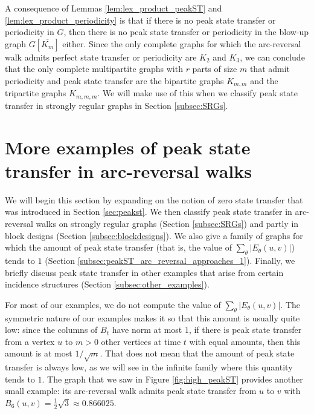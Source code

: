 \documentclass{article}
\numberwithin{equation}{section}
\begin{document}
A consequence of Lemmas \ref{lem:lex_product_peakST} and \ref{lem:lex_product_periodicity} is that if there is no peak state transfer or periodicity in $G$, then there is no peak state transfer or periodicity in the blow-up graph $G[\overline{K_m}]$ either. Since the only complete graphs for which the arc-reversal walk admits perfect state transfer or periodicity are $K_2$ and $K_3$, we can conclude that the only complete multipartite graphs with $r$ parts of size $m$ that admit periodicity and peak state transfer are the bipartite graphs $K_{m,m}$ and the tripartite graphs $K_{m,m,m}$. We will make use of this when we classify peak state transfer in strongly regular graphs in Section \ref{subsec:SRGs}.












\section{More examples of peak state transfer in arc-reversal walks}\label{sec:examples}
We will begin this section by expanding on the notion of zero state transfer that was introduced in Section \ref{sec:peakst}. We then classify peak state transfer in arc-reversal walks on strongly regular graphs (Section \ref{subsec:SRGs}) and partly in block designs (Section \ref{subsec:blockdesigns}). We also give a family of graphs for which the amount of peak state transfer (that is, the value of $\sum_{\theta}|E_\theta(u,v)|$) tends to $1$ (Section \ref{subsec:peakST_arc_reversal_approaches_1}). Finally, we briefly discuss peak state transfer in other examples that arise from certain incidence structures (Section \ref{subsec:other_examples}). 

For most of our examples, we do not compute the value of $\sum_{\theta} |E_\theta(u,v)|$. The symmetric nature of our examples makes it so that this amount is usually quite low: since the columns of $B_t$ have norm at most $1$, if there is peak state transfer from a vertex $u$ to $m > 0$ other vertices at time $t$ with equal amounts, then this amount is at most $1/\sqrt{m}$. That does not mean that the amount of peak state transfer is always low, as we will see in the infinite family where this quantity tends to $1$. The graph that we saw in Figure \ref{fig:high_peakST}  provides another small example: its  arc-reversal walk admits peak state transfer from $u$ to $v$ with $B_6(u,v) = \frac{1}{2}\sqrt{3} \approx 0.866025$.  
\end{document}

